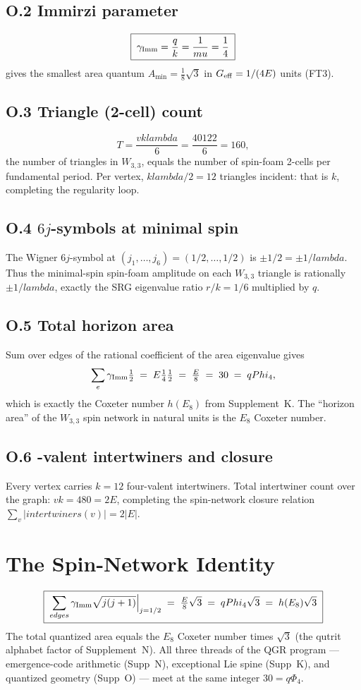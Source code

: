 \documentclass[12pt,a4paper]{article}
\def\text#1{#1}%
\def\lambda{lambda}%
\def\mu{mu}%
\def\Phi#1{Phi#1}%
\def\cdot{ }%
\theoremstyle{definition}
\begin{document}
\subsection*{O.2 \quad Immirzi parameter}
\[
\boxed{\;\gamma_{\rm Imm} = \frac{q}{k} = \frac{1}{\mu} = \frac{1}{4}\;}
\]
gives the smallest area quantum
$A_{\min} = \tfrac{1}{8}\sqrt{3}$ in $G_{\rm eff}=1/(4E)$ units (FT3).

\subsection*{O.3 \quad Triangle (2-cell) count}
\[
T = \frac{vk\lambda}{6} = \frac{40\cdot 12\cdot 2}{6} = 160,
\]
the number of triangles in $W_{3,3}$, equals the number of spin-foam
2-cells per fundamental period. Per vertex, $k\lambda/2 = 12$ triangles
incident: that is $k$, completing the regularity loop.

\subsection*{O.4 \quad $6j$-symbols at minimal spin}
The Wigner $6j$-symbol at $(j_1,\ldots,j_6)=(1/2,\ldots,1/2)$ is
$\pm 1/2 = \pm 1/\lambda$. Thus the minimal-spin spin-foam amplitude
on each $W_{3,3}$ triangle is rationally $\pm 1/\lambda$, exactly the
SRG eigenvalue ratio $r/k = 1/6$ multiplied by $q$.

\subsection*{O.5 \quad Total horizon area}
Sum over edges of the rational coefficient of the area eigenvalue
gives
\[
\sum_e \gamma_{\rm Imm}\cdot\tfrac{1}{2} \;=\;
E\cdot\tfrac{1}{4}\cdot\tfrac{1}{2} \;=\; \tfrac{E}{8} \;=\; 30 \;=\; q\Phi_4,
\]
which is exactly the Coxeter number $h(E_8)$ from Supplement~K. The
``horizon area'' of the $W_{3,3}$ spin network in natural units is the
$E_8$ Coxeter number.

\subsection*{O.6 -valent intertwiners and closure}
Every vertex carries $k = 12$ four-valent intertwiners. Total
intertwiner count over the graph: $vk = 480 = 2E$, completing the
spin-network closure relation $\sum_v|\text{intertwiners}(v)| = 2|E|$.

\section*{The Spin-Network Identity}
\[
\boxed{\;\sum_{\text{edges}} \gamma_{\rm Imm}\cdot\sqrt{j(j+1)}\Big|_{j=1/2}
\;=\; \tfrac{E}{8}\sqrt{3} \;=\; q\Phi_4\sqrt{3} \;=\; h(E_8)\sqrt{3}\;}
\]
The total quantized area equals the $E_8$ Coxeter number times $\sqrt{3}$
(the qutrit alphabet factor of Supplement~N). All three threads of the
QGR program — emergence-code arithmetic (Supp~N), exceptional Lie
spine (Supp~K), and quantized geometry (Supp~O) — meet at the same
integer $30 = q\Phi_4$.
\end{document}
